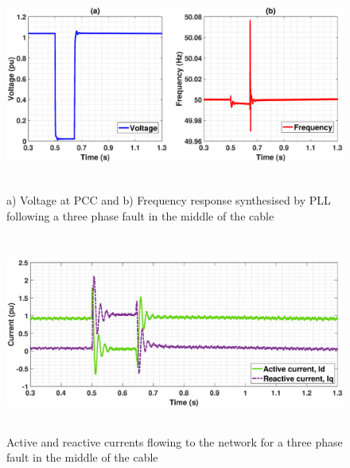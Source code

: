 \begin{figure}[H]
    \includegraphics[height = 7cm,width = \textwidth]{Diagrams/Chapter_3/VACP_Freq_Final_3.eps}
    \caption{a) Voltage at PCC and b) Frequency response synthesised by PLL following a three phase fault in the middle of the cable}
    \label{fig:Vol_Freq_3phaseSC}
\end{figure}


\begin{figure}[H]
    \includegraphics[height = 6.5cm,width = \textwidth]{Diagrams/Chapter_3/ID_IQ_Final_4.eps}
    \caption{Active and reactive currents flowing to the network for a three phase fault in the middle of the cable}
    \label{fig:ID_IQ_Final_3}
\end{figure}


